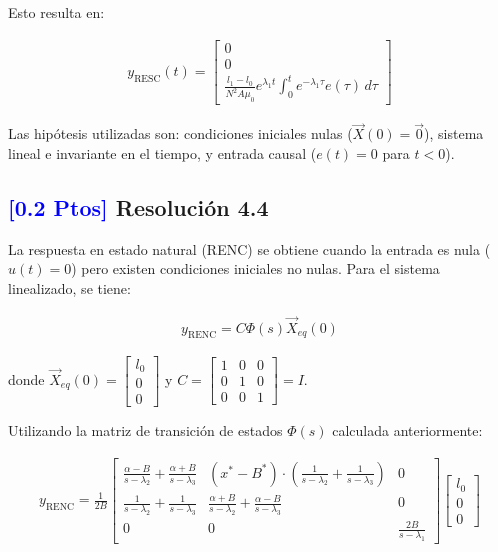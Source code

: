 \documentclass[
  11pt,
  letterpaper,
   addpoints,
   answers
  ]{exam}
\begin{document}
\begin{solution}
Esto resulta en:

\begin{align}
y_{\text{RESC}}(t) = \begin{bmatrix}
0 \\
0 \\
\frac{l_1 - l_0}{N^2A\mu_0} e^{\lambda_1 t} \int_0^t e^{-\lambda_1\tau} e(\tau) \, d\tau
\end{bmatrix}
\end{align}

Las hipótesis utilizadas son: condiciones iniciales nulas ($\vec{X}(0) = \vec{0}$), sistema lineal e invariante en el tiempo, y entrada causal ($e(t) = 0$ para $t < 0$).

\subsection*{\textcolor{blue}{[0.2 Ptos]} Resolución 4.4}

La respuesta en estado natural (RENC) se obtiene cuando la entrada es nula ($u(t) = 0$) pero existen condiciones iniciales no nulas. Para el sistema linealizado, se tiene:

\begin{align}
y_{\text{RENC}} = C \Phi(s) \vec{X}_{eq}(0)
\end{align}

donde $\vec{X}_{eq}(0) = \begin{bmatrix} l_0 \\ 0 \\ 0 \end{bmatrix}$ y $C = \begin{bmatrix} 1 & 0 & 0 \\ 0 & 1 & 0 \\ 0 & 0 & 1 \end{bmatrix} = I$.

Utilizando la matriz de transición de estados $\Phi(s)$ calculada anteriormente:

\begin{align}
y_{\text{RENC}} = \frac{1}{2B} \begin{bmatrix}
\frac{\alpha - B}{s - \lambda_2} + \frac{\alpha + B}{s - \lambda_3} & (x^* - B^*) \cdot \left(\frac{1}{s - \lambda_2} + \frac{1}{s - \lambda_3}\right) & 0 \\
\frac{1}{s - \lambda_2} + \frac{1}{s - \lambda_3} & \frac{\alpha + B}{s - \lambda_2} + \frac{\alpha - B}{s - \lambda_3} & 0 \\
0 & 0 & \frac{2B}{s - \lambda_1}
\end{bmatrix} \begin{bmatrix}
l_0 \\
0 \\
0
\end{bmatrix}
\end{align}


\end{solution}
\end{document}
